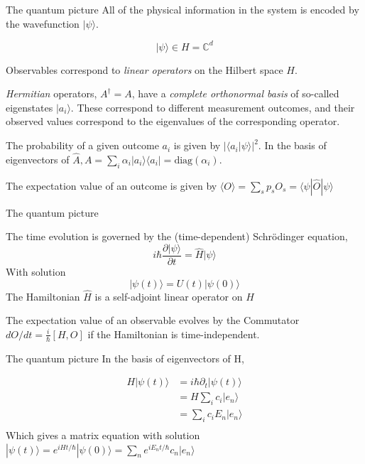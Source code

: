 \documentclass[10pt]{beamer}
\begin{document}
\begin{frame}{The quantum picture}
All of the physical information in the system is encoded by the wavefunction $|\psi\rangle$.

$$|\psi\rangle \in H = \mathbb{C}^d$$ 

    Observables correspond to \emph{linear operators} on the Hilbert space $H$. 
    
    \emph{Hermitian} operators, $A^\dagger = A$, have a \emph{complete orthonormal basis} of so-called eigenstates $|a_i\rangle$. These correspond to different measurement outcomes, and their observed values correspond to the eigenvalues of the corresponding operator.
    
    The probability of a given outcome $a_i$ is given by $|\langle a_i|\psi\rangle|^2$.
    In the basis of eigenvectors of $\hat{A}, A = \sum_i \alpha_i |a_i\rangle\langle a_i| = \textrm{diag}(\alpha_i)$.
    
    The expectation value of an outcome is given by $\langle O \rangle = \sum_s p_s O_s = \langle\psi|\hat{O}|\psi\rangle$

\end{frame}
\begin{frame}{The quantum picture}

The time evolution is governed by the (time-dependent) Schr\"{o}dinger equation,
$$  i \hbar\frac{\partial |\psi\rangle}{\partial t} = \hat{H} |\psi\rangle$$
With solution
$$ |\psi(t)\rangle = U(t)|\psi(0)\rangle$$
The Hamiltonian $\hat{H}$ is a self-adjoint linear operator on $H$
    
    The expectation value of an observable evolves by the Commutator $d O/d t = \frac{i}{\hbar}[H,O]$ if the Hamiltonian is time-independent.
    
\end{frame}

\begin{frame}{The quantum picture}
    In the basis of eigenvectors of H,

\begin{align*}
    H|\psi(t)\rangle &= i\hbar \partial_t|\psi(t)\rangle\\
    &= H\sum_i c_i|e_n\rangle\\
    &= \sum_i c_i E_n |e_n\rangle\\
\end{align*}
Which gives a matrix equation with solution $|\psi(t) \rangle = e^{iHt/\hbar} |\psi(0)\rangle = \sum_n e^{i E_n t/\hbar} c_n |e_n\rangle$

\end{frame}
\end{document}
